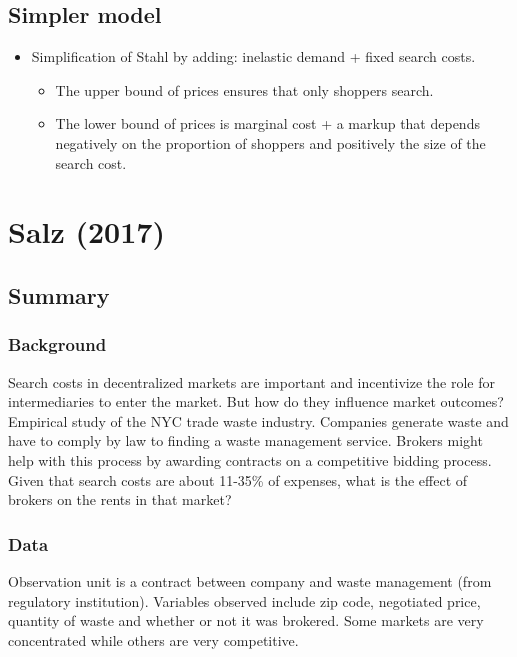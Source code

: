 \subsection{Simpler model}

\begin{itemize}
\item Simplification of Stahl by adding: inelastic demand + fixed search costs.
\begin{itemize}
\item The upper bound of prices ensures that only shoppers search.
\item The lower bound of prices is marginal cost + a markup that depends negatively on the proportion of shoppers and positively the size of the search cost.
\end{itemize}
\end{itemize}

\section{Salz (2017)}

\subsection{Summary}

\subsubsection{Background}

Search costs in decentralized markets are important and incentivize the role for intermediaries to enter the market. But how do they influence market outcomes? Empirical study of the NYC trade waste industry. Companies generate waste and have to comply by law to finding a waste management service. Brokers might help with this process by awarding contracts on a competitive bidding process. Given that search costs are about 11-35\% of expenses, what is the effect of brokers on the rents in that market?

\subsubsection{Data}

Observation unit is a contract between company and waste management (from regulatory institution). Variables observed include zip code, negotiated price, quantity of waste and whether or not it was brokered. Some markets are very concentrated while others are very competitive.


